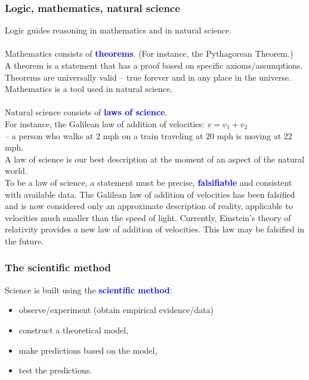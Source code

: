 \documentclass[aspectratio=169,xcolor=pdftex,dvipsnames]{beamer} %
\newcommand{\jemph}[1]{\textcolor{Blue}{\textbf{#1}}}
\begin{document}
\begin{frame}
\frametitle{Logic, mathematics, natural science}

Logic guides reasoning in mathematics and in natural science.
\\ \ \\
Mathematics consists of \jemph{theorems}. (For instance, the Pythagorean Theorem.)\\
A theorem is a statement that has a proof based on specific axioms/assumptions.\\
Theorems are universally valid -- true forever and in any place in the universe.\\
Mathematics is a tool used in natural science.
\\ \ \\
Natural science consists of \jemph{laws of science}.\\
For instance, the Galilean law of addition of velocities: $v = v_1 + v_2$ \\ -- 
a person who walks at 2 mph on a train traveling at 20 mph is moving at 22 mph.\\
A\! law of science is our best description at the\! moment of an\! aspect of the\! natural world.\\
To be a law of science, a statement must be precise, \jemph{falsifiable} and consistent with available data.
The Galilean law of addition of velocities has been falsified and is now considered only an approximate description of reality, applicable to velocities much smaller than the speed of light. Currently, Einstein's theory of relativity provides a new law of addition of velocities. This law may be falsified in the future.
\end{frame}


\begin{frame}
\frametitle{The scientific method}

Science is built using the \jemph{scientific method}:\\

\begin{itemize}
\item
observe/experiment (obtain empirical evidence/data)
\item
construct a theoretical model, 
\item
make predictions based on the model, 
\item
test the predictions.
\end{itemize}
\end{frame}
\end{document}
